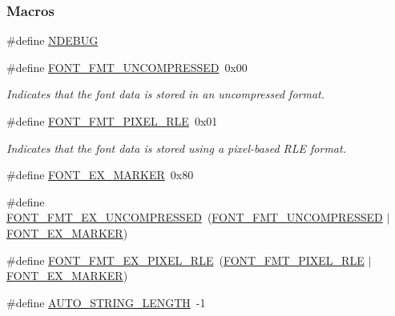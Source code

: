 \subsubsection*{Macros}
\begin{DoxyCompactItemize}
\item 
\#define \hyperlink{grlib_8h_a8de3ed741dadc9c979a4ff17c0a9116e}{N\+D\+E\+B\+U\+G}
\item 
\#define \hyperlink{group__primitives__api_ga2a31fdac9b1c2fa434ae27fd819a4eec}{F\+O\+N\+T\+\_\+\+F\+M\+T\+\_\+\+U\+N\+C\+O\+M\+P\+R\+E\+S\+S\+E\+D}~0x00
\begin{DoxyCompactList}\small\item\em Indicates that the font data is stored in an uncompressed format. \end{DoxyCompactList}\item 
\#define \hyperlink{group__primitives__api_ga94fcc0b769073d918b5356b8e451185e}{F\+O\+N\+T\+\_\+\+F\+M\+T\+\_\+\+P\+I\+X\+E\+L\+\_\+\+R\+L\+E}~0x01
\begin{DoxyCompactList}\small\item\em Indicates that the font data is stored using a pixel-\/based R\+L\+E format. \end{DoxyCompactList}\item 
\#define \hyperlink{group__primitives__api_ga3d49714fe224dbaae723df08ac70341d}{F\+O\+N\+T\+\_\+\+E\+X\+\_\+\+M\+A\+R\+K\+E\+R}~0x80
\item 
\#define \hyperlink{group__primitives__api_ga918f13c1ee1bcab7fcc85dfded454dd9}{F\+O\+N\+T\+\_\+\+F\+M\+T\+\_\+\+E\+X\+\_\+\+U\+N\+C\+O\+M\+P\+R\+E\+S\+S\+E\+D}~(\hyperlink{group__primitives__api_ga2a31fdac9b1c2fa434ae27fd819a4eec}{F\+O\+N\+T\+\_\+\+F\+M\+T\+\_\+\+U\+N\+C\+O\+M\+P\+R\+E\+S\+S\+E\+D} $\vert$ \hyperlink{group__primitives__api_ga3d49714fe224dbaae723df08ac70341d}{F\+O\+N\+T\+\_\+\+E\+X\+\_\+\+M\+A\+R\+K\+E\+R})
\item 
\#define \hyperlink{group__primitives__api_ga4673322aefbfe3faf04fef282f91819d}{F\+O\+N\+T\+\_\+\+F\+M\+T\+\_\+\+E\+X\+\_\+\+P\+I\+X\+E\+L\+\_\+\+R\+L\+E}~(\hyperlink{group__primitives__api_ga94fcc0b769073d918b5356b8e451185e}{F\+O\+N\+T\+\_\+\+F\+M\+T\+\_\+\+P\+I\+X\+E\+L\+\_\+\+R\+L\+E} $\vert$ \hyperlink{group__primitives__api_ga3d49714fe224dbaae723df08ac70341d}{F\+O\+N\+T\+\_\+\+E\+X\+\_\+\+M\+A\+R\+K\+E\+R})
\item 
\#define \hyperlink{group__primitives__api_ga0ab84b39cc131f7bbe32789bcf55c6be}{A\+U\+T\+O\+\_\+\+S\+T\+R\+I\+N\+G\+\_\+\+L\+E\+N\+G\+T\+H}~-\/1
\item 

\end{DoxyCompactItemize}
